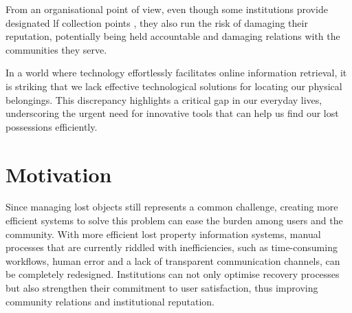 From an organisational point of view, even though some institutions provide designated \ac{lf} collection points \cite{Tan2023}, they also run the risk of damaging their reputation, potentially being held accountable and damaging relations with the communities they serve.

In a world where technology effortlessly facilitates online information retrieval, it is striking that we lack effective technological solutions for locating our physical belongings. This discrepancy highlights a critical gap in our everyday lives, underscoring the urgent need for innovative tools that can help us find our lost possessions efficiently.

\section{Motivation} \label{section:motivation}

Since managing lost objects still represents a common challenge, creating more efficient systems to solve this problem can ease the burden among users and the community. With more efficient lost property information systems, manual processes that are currently riddled with inefficiencies, such as time-consuming workflows, human error and a lack of transparent communication channels, can be completely redesigned. Institutions can not only optimise recovery processes but also strengthen their commitment to user satisfaction, thus improving community relations and institutional reputation.

